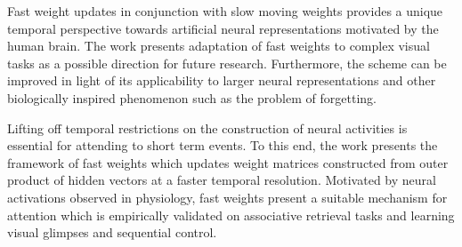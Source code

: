 \documentclass[11pt,letterpaper]{article}
\begin{document}
Fast weight updates in conjunction with slow moving weights provides a unique temporal perspective towards artificial neural representations motivated by the human brain. The work presents adaptation of fast weights to complex visual tasks as a possible direction for future research. Furthermore, the scheme can be improved in light of its applicability to larger neural representations and other biologically inspired phenomenon such as the problem of forgetting.

Lifting off temporal restrictions on the construction of neural activities is essential for attending to short term events. To this end, the work presents the framework of fast weights which updates weight matrices constructed from outer product of hidden vectors at a faster temporal resolution. Motivated by neural activations observed in physiology, fast weights present a suitable mechanism for attention which is empirically validated on associative retrieval tasks and learning visual glimpses and sequential control.
\end{document}
